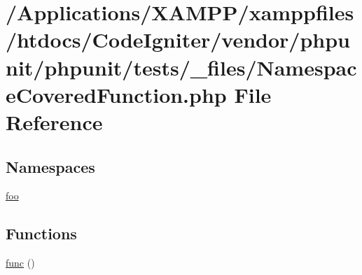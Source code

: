 \hypertarget{_namespace_covered_function_8php}{}\section{/\+Applications/\+X\+A\+M\+P\+P/xamppfiles/htdocs/\+Code\+Igniter/vendor/phpunit/phpunit/tests/\+\_\+files/\+Namespace\+Covered\+Function.php File Reference}
\label{_namespace_covered_function_8php}
\subsection*{Namespaces}
\begin{DoxyCompactItemize}
\item 
 \mbox{\hyperlink{namespacefoo}{foo}}
\end{DoxyCompactItemize}
\subsection*{Functions}
\begin{DoxyCompactItemize}
\item 
\mbox{\hyperlink{namespacefoo_ad6d2ba6f0c3fb27a84b6ff10e945e96d}{func}} ()
\end{DoxyCompactItemize}
